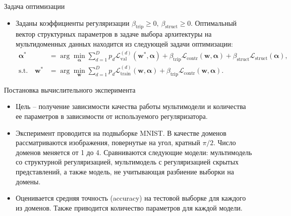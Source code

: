 \documentclass[aspectratio=169]{beamer}
\def\bw{\mathbf{w}}
\def\balpha{\boldsymbol{\alpha}}
\begin{document}
\begin{frame}{Задача оптимизации}
\begin{itemize}
  \item Заданы коэффициенты регуляризации $\beta_\text{trip} \geq 0, ~\beta_\text{struct} \geq 0$.
  Оптимальный вектор структурных параметров в задаче выбора архитектуры на мультидоменных
  данных находится из следующей задачи оптимизации:
  \begin{align*}
    \boldsymbol\alpha^* &= \arg\min_{\boldsymbol\alpha}\sum_{d=1}^Dp_d
    \mathcal{L}_\text{val}^{(d)}(\bw^*, \boldsymbol\alpha) + 
    \beta_\text{trip}\mathcal{L}_\text{contr}(\bw, \balpha) + 
    \beta_\text{struct}\mathcal{L}_\text{struct}(\balpha)
    ,\\
    \mathrm{s.t.}\quad \bw^* &= \arg\min_{\bw}\sum_{d=1}^Dp_d
    \mathcal{L}_\text{train}^{(d)}(\bw, \balpha) +
    \beta_\text{trip}\mathcal{L}_\text{contr}(\bw, \balpha).
  \end{align*}
  
\end{itemize}
\end{frame}




\begin{frame}{Постановка вычислительного эксперимента}

\begin{itemize}
\item Цель -- получение зависимости качества работы мультимодели и
количества ее параметров в зависимости от используемого регуляризатора.
\item Эксперимент проводится на подвыборке MNIST. В качестве доменов рассматриваются
изображения, повернутые на угол, кратный $\pi/2$. Число доменов меняется от 1 до 4.
 Сравниваются следующие модели:
мультимодель со структурной регуляризацией, мультимодель с регуляризацией скрытых представлений,
а также модель, не учитывающая разбиение выборки на домены.
\item Оценивается средняя точность (accuracy) на тестовой выборке для каждого из доменов.
Также приводится количество параметров для каждой модели.
\end{itemize}

\end{frame}
\end{document}
